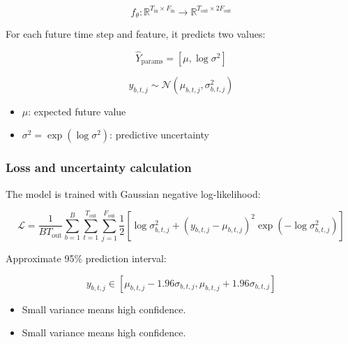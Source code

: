 \documentclass[a4paper]{article}
\begin{document}
         \[
         f_{\theta}:
         \mathbb{R}^{T_{\mathrm{in}} \times F_{\mathrm{in}}}
         \rightarrow
         \mathbb{R}^{T_{\mathrm{out}} \times 2F_{\mathrm{out}}}
         \]

         For each future time step and feature, it predicts two values:

         \[
         \hat{Y}_{\mathrm{params}}
         =
         [
         \mu,
         \log \sigma^2
         ]
         \]

         \[
         y_{b,t,j}
         \sim
         \mathcal{N}
         (
         \mu_{b,t,j},
         \sigma^2_{b,t,j}
         )
         \]

         \begin{itemize}
            \item \(\mu\): expected future value
            \item \(\sigma^2 = \exp(\log \sigma^2)\): predictive uncertainty
         \end{itemize}

         \subsubsection{Loss and uncertainty calculation}
            The model is trained with Gaussian negative log-likelihood:

            \[
            \mathcal{L}
            =
            \frac{1}{BT_{\mathrm{out}}}
            \sum_{b=1}^{B}
            \sum_{t=1}^{T_{\mathrm{out}}}
            \sum_{j=1}^{F_{\mathrm{out}}}
            \frac{1}{2}
            \left[
            \log \sigma^2_{b,t,j}
            +
            (y_{b,t,j}-\mu_{b,t,j})^2
            \exp
            (
            -\log \sigma^2_{b,t,j}
            )
            \right]
            \]

            Approximate 95\% prediction interval:

            \[
            y_{b,t,j}
            \in
            [
            \mu_{b,t,j}
            -
            1.96\sigma_{b,t,j},
            \mu_{b,t,j}
            +
            1.96\sigma_{b,t,j}
            ]
            \]

            \begin{itemize}
               \item Small variance means high confidence.
               \item Small variance means high confidence.
            \end{itemize}
\end{document}

